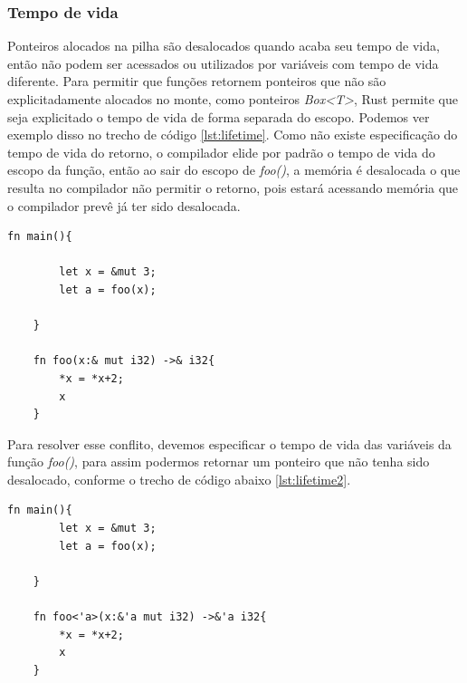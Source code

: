 \documentclass[rel_mlp]{iiufrgs}
\begin{document}
\subsubsection{Tempo de vida}
Ponteiros alocados na pilha são desalocados quando acaba seu tempo de vida, então não podem ser acessados ou utilizados por variáveis com tempo de vida diferente. Para permitir que funções retornem ponteiros que não são explicitadamente alocados no monte, como ponteiros \textit{Box<T>}, Rust permite que seja explicitado o tempo de vida de forma separada do escopo. Podemos ver exemplo disso no trecho de código \ref{lst:lifetime}. Como não existe especificação do tempo de vida do retorno, o compilador elide por padrão o tempo de vida do escopo da função, então ao sair do escopo de \textit{foo()}, a memória é desalocada o que resulta no compilador não permitir o retorno, pois estará acessando memória que o compilador prevê já ter sido desalocada.

\begin{lstlisting}[frame =single, label={lst:lifetime},caption={Exemplo de tempo de vida}]
    fn main(){
    
        let x = &mut 3;
        let a = foo(x);
        
    }
    
    fn foo(x:& mut i32) ->& i32{
        *x = *x+2;
        x
    }
\end{lstlisting}

Para resolver esse conflito, devemos especificar o tempo de vida das variáveis da função \textit{foo()}, para assim podermos retornar um ponteiro que não tenha sido desalocado, conforme o trecho de código abaixo \ref{lst:lifetime2}.

\begin{lstlisting}[frame = single, label={lst:lifetime2},caption={Exemplo dois de tempo de vida}]
    fn main(){
        let x = &mut 3;
        let a = foo(x);
        
    }
    
    fn foo<'a>(x:&'a mut i32) ->&'a i32{
        *x = *x+2;
        x
    }
\end{lstlisting}
\end{document}
